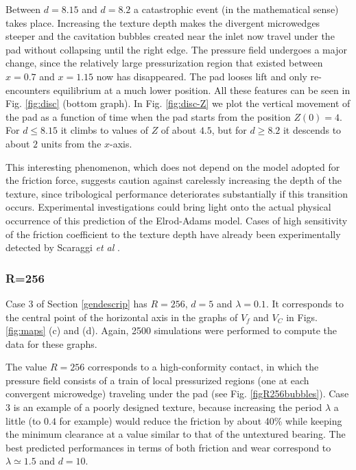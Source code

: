 Between $d=8.15$ and $d=8.2$ a catastrophic event
(in the mathematical sense) takes place. Increasing
the texture depth makes the divergent microwedges steeper
and the cavitation bubbles created near the inlet now
travel under the pad without collapsing until the right edge.
The pressure field undergoes a major change, since
the relatively large pressurization region that existed
between $x=0.7$ and $x=1.15$ now has disappeared.
The pad looses lift and only re-encounters equilibrium
at a much lower position. All these features can be
seen in Fig. \ref{fig:disc} (bottom graph). In Fig. \ref{fig:disc-Z}
we plot the vertical movement of the pad as a
function of time when the pad starts from the
position $Z(0)=4$. For $d\leq 8.15$ it climbs to
values of $Z$ of about $4.5$, but for $d\geq 8.2$
it descends to about $2$ units from the $x$-axis.

This interesting phenomenon, which does not depend on
the model adopted for the friction force, 
suggests caution against carelessly increasing
the depth of the texture, since tribological performance
deteriorates substantially if this transition occurs.
Experimental investigations could bring light
onto the actual physical occurrence of this prediction of the
Elrod-Adams model. Cases of high sensitivity of the friction coefficient
to the texture depth have already been experimentally detected
by Scaraggi {\em et al} \cite{scar2013b}.


\subsubsection{R=256}
\label{r256}

Case 3 of Section \ref{gendescrip} has $R=256$, $d=5$
and $\lambda = 0.1$. It corresponds to the central point
of the horizontal axis in the graphs of $V_f$ and $V_C$
in Figs. \ref{fig:maps} (c) and (d). Again, 2500 simulations
were performed to compute the data for these graphs.

The value $R=256$ corresponds to a high-conformity contact,
in which the pressure field consists of a train of local
pressurized regions (one at each convergent microwedge)
traveling under the pad (see Fig. \ref{figR256bubbles}). 
Case 3 is an example of a
poorly designed texture, because increasing the period
$\lambda$ a little (to $0.4$ for example) would reduce
the friction by about 40\% while keeping the minimum
clearance at a value similar to that of the untextured
bearing. The best predicted performances in terms of
both friction and wear correspond to $\lambda\simeq 1.5$
and $d=10$.

